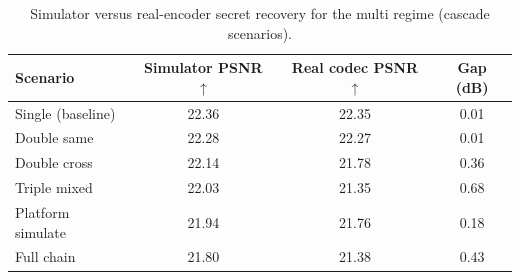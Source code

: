 \begin{table}[t]
\centering
\caption{Simulator versus real-encoder secret recovery for the multi regime (cascade scenarios).}
\label{tab:multi-cascade-gap}
\begin{tabular}{lccc}
\toprule
Scenario & Simulator PSNR $\uparrow$ & Real codec PSNR $\uparrow$ & Gap (dB) \\
\midrule
Single (baseline) & 22.36 & 22.35 & 0.01 \\
Double same & 22.28 & 22.27 & 0.01 \\
Double cross & 22.14 & 21.78 & 0.36 \\
Triple mixed & 22.03 & 21.35 & 0.68 \\
Platform simulate & 21.94 & 21.76 & 0.18 \\
Full chain & 21.80 & 21.38 & 0.43 \\
\bottomrule
\end{tabular}
\end{table}
